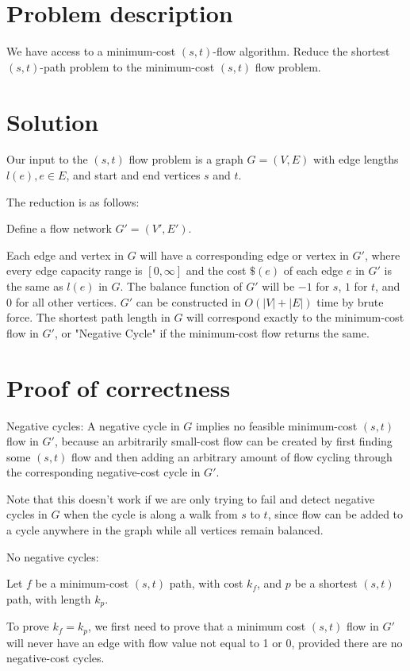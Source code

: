 \documentclass{article}
\begin{document}
\section{Problem description}

We have access to a minimum-cost $(s,t)$-flow algorithm. Reduce the shortest
$(s,t)$-path problem to the minimum-cost $(s,t)$ flow problem.

\section{Solution}

Our input to the $(s,t)$ flow problem is a graph $G = (V,E)$ with edge
lengths $l(e), e \in E$, and start and end vertices $s$ and $t$.

The reduction is as follows:

Define a flow network $G' = (V', E')$. 

Each edge and vertex in $G$ will have a corresponding edge or vertex in $G'$, where
every edge capacity range is $[0, \infty]$ and the cost $\$(e)$ of each edge $e$ in
$G'$ is the same as $l(e)$ in $G$. The balance function of $G'$ will be $-1$ for
$s$, $1$ for $t$, and 0 for all other vertices. $G'$ can be constructed in
$O(|V| + |E|)$ time by brute force. The shortest path length in
$G$ will correspond exactly to the minimum-cost flow in $G'$, or "Negative
Cycle" if the minimum-cost flow returns the same.

\section{Proof of correctness}

Negative cycles: A negative cycle in $G$ implies no feasible minimum-cost
$(s,t)$ flow in $G'$, because an arbitrarily small-cost flow can be created by
first finding some $(s,t)$ flow and then adding an arbitrary amount of flow
cycling through the corresponding negative-cost cycle in $G'$.

Note that this doesn't work if we are only trying to fail and detect negative
cycles in $G$ when the cycle is along a walk from $s$ to $t$, since flow can
be added to a cycle anywhere in the graph while all vertices remain balanced.

No negative cycles:

Let $f$ be a minimum-cost $(s,t)$ path, with cost $k_f$, and
$p$ be a shortest $(s,t)$ path, with length $k_p$.

To prove $k_f = k_p$, we first need to prove that a minimum cost $(s,t)$ flow
in $G'$ will never have an edge with flow value not equal to 1 or 0, provided there
are no negative-cost cycles.
\end{document}
